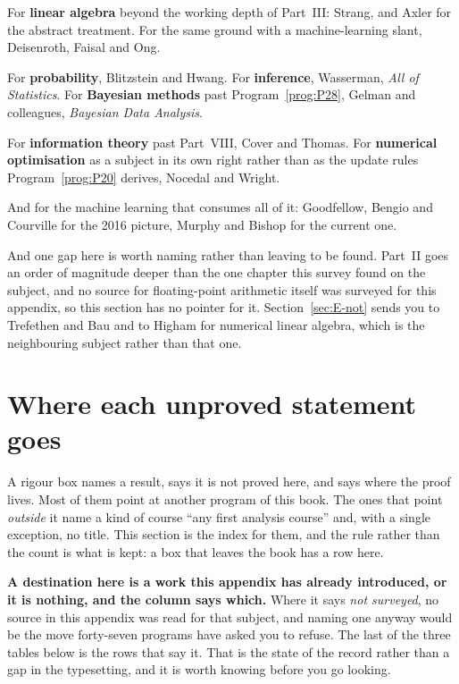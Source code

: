 \medskip
For \textbf{linear algebra} beyond the working depth of Part~III: Strang, and Axler
for the abstract treatment. For the same ground with a machine-learning slant,
Deisenroth, Faisal and Ong.

For \textbf{probability}, Blitzstein and Hwang. For \textbf{inference}, Wasserman,
\emph{All of Statistics}. For \textbf{Bayesian methods} past
Program~\ref{prog:P28}, Gelman and colleagues, \emph{Bayesian Data
Analysis}.

For \textbf{information theory} past Part~VIII, Cover and Thomas. For
\textbf{numerical optimisation} as a subject in its own right rather than as
the update rules Program~\ref{prog:P20} derives, Nocedal and Wright.

And for the machine learning that consumes all of it: Goodfellow, Bengio and
Courville for the 2016 picture, Murphy and Bishop for the current one.

\medskip
And one gap here is worth naming rather than leaving to be found. Part~II goes
an order of magnitude deeper than the one chapter this survey found on the
subject, and no source for floating-point arithmetic itself was surveyed for
this appendix, so this section has no pointer for it.
Section~\ref{sec:E-not} sends you to Trefethen and Bau and to Higham for
numerical linear algebra, which is the neighbouring subject rather than that
one.

\section{Where each unproved statement goes}
\label{sec:E-route}

A rigour box names a result, says it is not proved here, and says where the
proof lives. Most of them point at another program of this book. The ones that
point \emph{outside} it name a kind of course \dash{} \enquote{any first
analysis course} \dash{} and, with a single exception, no title. This section
is the index for them, and the rule rather than the count is what is kept: a
box that leaves the book has a row here.

\begin{note}
\textbf{A destination here is a work this appendix has already introduced, or
it is nothing, and the column says which.} Where it says \emph{not surveyed},
no source in this appendix was read for that subject, and naming one anyway
would be the move forty-seven programs have asked you to refuse. The last of
the three tables below is the rows that say it. That is the state of the
record rather than a gap in the typesetting, and it is worth knowing before
you go looking.
\end{note}

